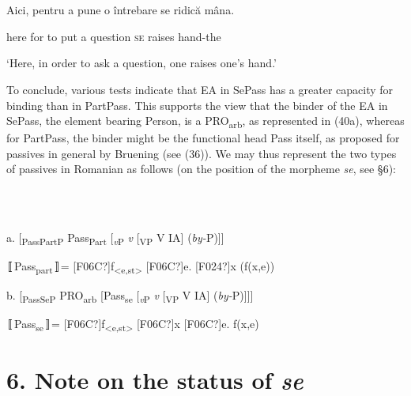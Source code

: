 \documentclass[output=paper]{langsci/langscibook}
\begin{document}
\ea%
    \label{ex:key:52}
    \gll\\
        \\
    \glt
    \z

          Aici, pentru a pune o întrebare se ridică mâna.   

here  for     to put   a question  \textsc{se} raises hand-the

‘Here, in order to ask a question, one raises one’s hand.’

To conclude, various tests indicate that EA in SePass has a greater capacity for binding than in PartPass. This supports the view that the binder of the EA in SePass, the element bearing Person, is a PRO\textsubscript{arb}, as represented in (40a), whereas for PartPass, the binder might be the functional head Pass itself, as proposed for passives in general by Bruening (see (36)). We may thus represent the two types of passives in Romanian as follows (on the position of the morpheme \textit{se}, see §6):

\ea%
    \label{ex:key:53}
    \gll\\
        \\
    \glt
    \z

          a.  [\textsubscript{PassPartP} Pass\textsubscript{Part} [\textit{\textsubscript{v}}\textsubscript{P} \textit{v} [\textsubscript{VP} V IA] (\textit{by-}P)]]

   〚Pass\textsubscript{part}〛= [F06C?]f\textsubscript{<e,st>} [F06C?]e. [F024?]x (f(x,e))

b.   [\textsubscript{PassSeP} PRO\textsubscript{arb} [Pass\textsubscript{se} [\textit{\textsubscript{v}}\textsubscript{P} \textit{v} [\textsubscript{VP} V IA] (\textit{by-}P)]]]

   〚Pass\textsubscript{se}〛=  [F06C?]f\textsubscript{<e,st>} [F06C?]x [F06C?]e. f(x,e)

\section{ 6. Note on the status of \textit{se}}
\end{document}
